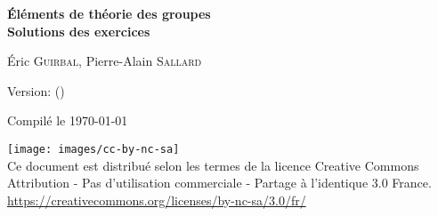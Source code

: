 
\thispagestyle{empty}
\null
\vfill
\begin{center}
  \small

  \textbf{%
    Éléments de théorie des groupes \\
    Solutions des exercices
  }
  \medskip

  Éric \textsc{Guirbal}, Pierre-Alain \textsc{Sallard}

  \medskip

  Version: \gitDescribe{} (\gitDate)

  Compilé le \today

  \vfill

  \texttt{[image: images/cc-by-nc-sa]} \\ [0.15cm]

  Ce document est distribué selon les termes de la licence Creative Commons
  Attribution - Pas d'utilisation commerciale - Partage à l'identique 3.0
  France. \\
  \url{https://creativecommons.org/licenses/by-nc-sa/3.0/fr/}
\end{center}

